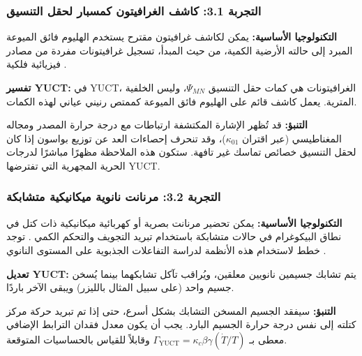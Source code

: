 \documentclass[11pt,a4paper]{article}
\begin{document}
	\subsubsection{التجربة 3.1: كاشف الغرافيتون كمسبار لحقل التنسيق}
	
	\textbf{التكنولوجيا الأساسية:} يمكن لكاشف غرافيتون مقترح يستخدم الهليوم فائق الميوعة المبرد إلى حالته الأرضية الكمية، من حيث المبدأ، تسجيل غرافيتونات مفردة من مصادر فيزيائية فلكية \cite{Berezin2025}.
	
	\textbf{تفسير YUCT:} في YUCT، الغرافيتونات هي كمات حقل التنسيق $\Psi_{MN}$، وليس الخلفية المترية. يعمل كاشف قائم على الهليوم فائق الميوعة كممتص رنيني عياني لهذه الكمات.
	
	\textbf{التنبؤ:} قد تُظهر الإشارة المكتشفة ارتباطات مع درجة حرارة المصدر ومجاله المغناطيسي (عبر اقتران $\kappa_{01}$)، وقد تنحرف إحصاءات العد عن توزيع بواسون إذا كان لحقل التنسيق خصائص تماسك غير تافهة. ستكون هذه الملاحظة مظهرًا مباشرًا لدرجات الحرية المجهرية التي تفترضها YUCT.
	
	\subsubsection{التجربة 3.2: مرنانت نانوية ميكانيكية متشابكة}
	
	\textbf{التكنولوجيا الأساسية:} يمكن تحضير مرنانت بصرية أو كهربائية ميكانيكية ذات كتل في نطاق البيكوغرام في حالات متشابكة باستخدام تبريد التجويف والتحكم الكمي \cite{Aspelmeyer2014}. توجد خطط لاستخدام هذه الأنظمة لدراسة التفاعلات الجذبوية على المستوى النانوي \cite{Geraci2010}.
	
	\textbf{تعديل YUCT:} يتم تشابك جسيمين نانويين معلقين، ويُراقب تآكل تشابكهما بينما يُسخن جسيم واحد (على سبيل المثال بالليزر) ويبقى الآخر باردًا.
	
	\textbf{التنبؤ:} سيفقد الجسيم المسخن التشابك بشكل أسرع، حتى إذا تم تبريد حركة مركز كتلته إلى نفس درجة حرارة الجسيم البارد. يجب أن يكون معدل فقدان الترابط الإضافي معطى بـ $\Gamma_{\mathrm{YUCT}} = \kappa_c \beta\gamma (\dot{T}/T)$ وقابلاً للقياس بالحساسيات المتوقعة.
	
\end{document}
